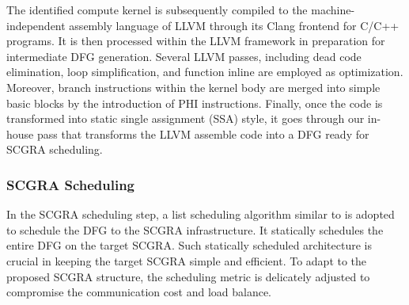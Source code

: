 

The identified compute kernel is subsequently compiled to the machine-independent assembly language of LLVM through its Clang frontend for C/C++ programs.  It is then processed within the LLVM framework in preparation for intermediate DFG generation.  Several LLVM passes, including dead code elimination, loop simplification, and function inline are employed as optimization.  Moreover, branch instructions within the kernel body are merged into simple basic blocks by the introduction of PHI instructions.  Finally, once the code is transformed into static single assignment (SSA) style, it goes through our in-house pass that transforms the LLVM assemble code into a DFG ready for SCGRA scheduling. 

\subsubsection{SCGRA Scheduling}
In the SCGRA scheduling step, a list scheduling algorithm similar to \cite{colinheart} is adopted to schedule the DFG to the SCGRA infrastructure. It statically schedules the entire DFG on the target SCGRA. Such statically scheduled architecture is crucial in keeping the target SCGRA simple and efficient. To adapt to the proposed SCGRA structure, the scheduling metric is delicately adjusted to compromise the communication cost and load balance.


